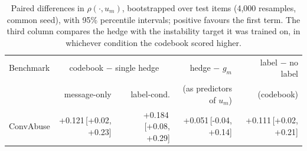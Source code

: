 \begin{table}[t]
\centering
\small
\begin{tabular}{lrrrr}
\hline
Benchmark & \multicolumn{2}{c}{codebook $-$ single hedge} & hedge $-$ $g_m$ & label $-$ no label \\
 & message-only & label-cond. & (as predictors of $u_m$) & (codebook) \\
\hline
ConvAbuse & +0.121{\scriptsize\,[+0.02, +0.23]} & +0.184{\scriptsize\,[+0.08, +0.29]} & +0.051{\scriptsize\,[-0.04, +0.14]} & +0.111{\scriptsize\,[+0.02, +0.21]} \\
\hline
\end{tabular}
\caption{Paired differences in $\rho(\cdot,u_m)$, bootstrapped over test items (4,000 resamples, common seed), with 95\% percentile intervals; positive favours the first term. The third column compares the hedge with the instability target it was trained on, in whichever condition the codebook scored higher.}
\label{tab:paired}
\end{table}